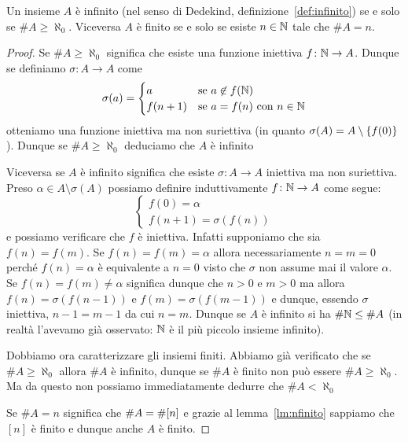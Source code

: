 \begin{theorem}
Un insieme $A$ è infinito (nel senso di Dedekind, definizione~\ref{def:infinito})
se e solo se $\# A \ge \aleph_0$.
Viceversa $A$ è finito se e solo se esiste $n\in{\mathbb N}$ tale che $\# A = n$.
\end{theorem}
%
\begin{proof}
Se $\#A \ge \aleph_0$ significa che esiste una funzione 
iniettiva $f\colon {\mathbb N}\to A$. 
Dunque se definiamo $\sigma \colon A \to A$ come
\[
\sigma(a) = \begin{cases}
  a & \text{se $a\not\in f({\mathbb N})$}\\
  f(n+1) & \text{se $a=f(n)$ con $n\in{\mathbb N}$}
\end{cases}
\]
otteniamo una funzione iniettiva ma non suriettiva 
(in quanto $\sigma(A) = A\setminus{\left\{ f(0) \right\}}$).
Dunque se $\#A\ge \aleph_0$ deduciamo che $A$ è infinito

Viceversa se $A$ è infinito significa che esiste $\sigma\colon A \to A$ 
iniettiva ma non suriettiva. 
Preso $\alpha \in A \setminus\sigma(A)$
possiamo definire induttivamente $f\colon {\mathbb N}\to A$ come segue:
\[
\begin{cases}
  f(0) = \alpha\\
  f(n+1) = \sigma(f(n))
\end{cases}
\]
e possiamo verificare che $f$ è iniettiva. 
Infatti supponiamo che sia $f(n)=f(m)$.
Se $f(n)=f(m)=\alpha$ allora necessariamente $n=m=0$ 
perché $f(n)=\alpha$ è equivalente a $n=0$ visto che $\sigma$
non assume mai il valore $\alpha$.
Se $f(n)=f(m)\neq \alpha$ significa dunque che $n>0$ e $m>0$
ma allora $f(n)=\sigma(f(n-1))$ e $f(m)=\sigma(f(m-1))$
e dunque, essendo $\sigma$ iniettiva, $n-1=m-1$ da cui $n=m$. 
Dunque se $A$ è infinito si ha $\#{\mathbb N}\le \#A$
(in realtà l'avevamo già osservato: ${\mathbb N}$ è il più piccolo insieme infinito).

Dobbiamo ora caratterizzare gli insiemi finiti.
Abbiamo già verificato che se $\#A \ge \aleph_0$ 
allora $\#A$ è infinito, dunque se $\#A$ è finito 
non può essere $\#A \ge \aleph_0$.
Ma da questo non possiamo immediatamente 
dedurre che%
%
$\#A < \aleph_0$%

Se $\#A = n$ significa che $\#A = \#{\left[ n \right]}$ e 
grazie al lemma~\ref{lm:nfinito} sappiamo che $[n]$ è finito 
e dunque anche $A$ è finito.


\end{proof}
